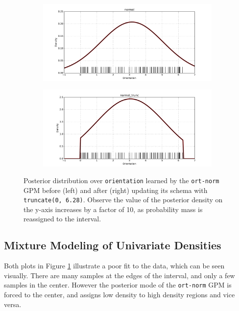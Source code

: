\documentclass[10pt,letterpaper]{article}
\numberwithin{figure}{section}
\numberwithin{table}{section}
\begin{document}
\begin{figure}[H]
\centering
\begin{subfigure}[t]{.45\textwidth}
  \centering
  \includegraphics[width=\linewidth]{../figures/normal-density}
\end{subfigure}
\begin{subfigure}[t]{0.45\textwidth}
  \centering
  \includegraphics[width=\linewidth]{../figures/normal-trunc-density}
\end{subfigure}
\caption{Posterior distribution over \texttt{orientation} learned by the
    \texttt{ort-norm} GPM before (left) and after (right) updating its schema
    with \texttt{truncate(0, 6.28)}. Observe the value of the posterior
    density on the y-axis increases by a factor of 10, as probability
    mass is reassigned to the interval.}
\label{fig:normal-densities}
\end{figure}

\subsection{Mixture Modeling of Univariate Densities}

Both plots in Figure \ref{fig:normal-densities} illustrate a poor fit to
the data, which can be seen visually. There are many samples at the edges of the
interval, and only a few samples in the center. However the posterior mode of
the \texttt{ort-norm} GPM is forced to the center, and assigns low density to
high density regions and vice versa.
\end{document}
